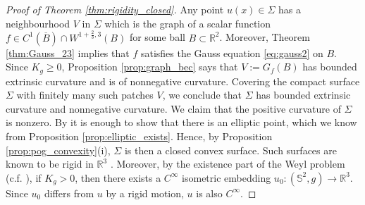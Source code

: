\documentclass[12pt]{article}
\newcommand{\R}{\mathbb{R}}
\theoremstyle{plain}
\numberwithin{equation}{section}
\begin{document}
\begin{proof}[Proof of Theorem \ref{thm:rigidity_closed}]
    Any point $u(x) \in \Sigma$ has a neighbourhood $V$ in $\Sigma$ which is the graph of a scalar function $f \in C^1(\overline B) \cap W^{1+\frac23,3}(B)$ for some ball $B \subset \R^2$. Moreover, Theorem \ref{thm:Gauss_23} implies that $f$ satisfies the Gauss equation \eqref{eq:gauss2} on $B$. Since $K_g \geq 0$, Proposition \ref{prop:graph_bec} says that $V := G_f(B)$ has bounded extrinsic curvature and is of nonnegative curvature. Covering the compact surface $\Sigma$ with finitely many such patches $V$, we conclude that $\Sigma$ has bounded extrinsic curvature and nonnegative curvature. We claim that the positive curvature of $\Sigma$ is nonzero. By \cite[Theorem 12, p. 600]{pogorelov_73} it is enough to show that there is an elliptic point, which we know from Proposition \ref{prop:elliptic_exists}. Hence, by Proposition \ref{prop:pog_convexity}(i), $\Sigma$ is then a closed convex surface. Such surfaces are known to be rigid in $\R^3$ \cite[Theorem 1, p. 167]{pogorelov_73}. Moreover, by the existence part of the Weyl problem (c.f. \cite[Chapter 9]{han_hong_06}), if $K_g > 0$, then there exists a $C^\infty$ isometric embedding $u_0 : (\mathbb{S}^2,g) \to \R^3$. Since $u_0$ differs from $u$ by a rigid motion, $u$ is also $C^\infty$.
\end{proof}
\end{document}
